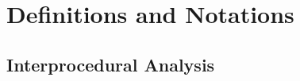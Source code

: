 \documentclass[letterpaper]{sig-alternate} \special{papersize=8.5in,11in}
\begin{document}
\section{Definitions and Notations} \label{sec:Formal_Definitions}


\subsection{Interprocedural Analysis} \label{Interprocedural_Analysis}




%  
\end{document}
